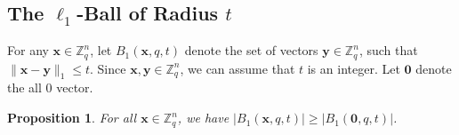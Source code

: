 \documentclass[pdflatex,sn-mathphys-num]{sn-jnl}
\newtheorem{proposition}{Proposition}
\theoremstyle{definition}
\newcommand{\vtr}[1]{\mathbf{#1}}
\newcommand{\norm}[1]{\lVert{#1}\rVert}
\begin{document}
\subsection{\texorpdfstring{The $\ell_1$-Ball of Radius $t$}{The l1-Ball of Radius t}}
For any $\vtr{x} \in \mathbb{Z}_q^n$, let $B_1(\vtr{x}, q, t)$ denote the set of vectors $\vtr{y} \in \mathbb{Z}_q^n$, such that $\norm{\vtr{x} - \vtr{y}}_1 \leq t$. Since $\vtr{x}, \vtr{y} \in \mathbb{Z}_q^n$, we can assume that $t$ is an integer. Let $\vtr{0}$ denote the all 0 vector. 

\begin{proposition}
\label{prop:ball-is-contained}
For all $\vtr{x} \in \mathbb{Z}_q^n$, we have $|B_1(\vtr{x}, q, t)| \geq  |B_1(\vtr{0}, q, t)|$.
\end{proposition}
\end{document}
